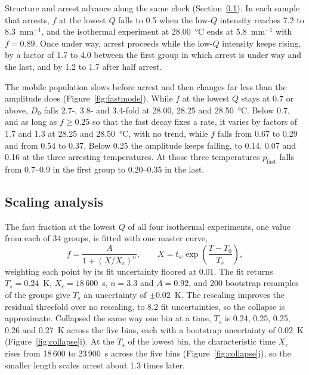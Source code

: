 \documentclass[11pt]{article}
\begin{document}
Structure and arrest advance along the same clock (Section~\ref{sec:scaling}). In each sample that arrests, $f$ at the lowest $Q$ falls to 0.5 when the low-$Q$ intensity reaches 7.2 to 8.3~mm$^{-1}$, and the isothermal experiment at \SI{28.00}{\degreeCelsius} ends at 5.8~mm$^{-1}$ with $f=0.89$. Once under way, arrest proceeds while the low-$Q$ intensity keeps rising, by a factor of 1.7 to 4.0 between the first group in which arrest is under way and the last, and by 1.2 to 1.7 after half arrest.

The mobile population slows before arrest and then changes far less than the amplitude does (Figure~\ref{fig:fastmode}). While $f$ at the lowest $Q$ stays at 0.7 or above, $D_0$ falls 2.7-, 3.8- and 3.4-fold at 28.00, 28.25 and \SI{28.50}{\degreeCelsius}. Below 0.7, and as long as $f\geq0.25$ so that the fast decay fixes a rate, it varies by factors of 1.7 and 1.3 at 28.25 and \SI{28.50}{\degreeCelsius}, with no trend, while $f$ falls from 0.67 to 0.29 and from 0.54 to 0.37. Below 0.25 the amplitude keeps falling, to 0.14, 0.07 and 0.16 at the three arresting temperatures. At those three temperatures $p_{\mathrm{fast}}$ falls from 0.7--0.9 in the first group to 0.20--0.35 in the last.

\subsection{Scaling analysis}
\label{sec:scaling}
The fast fraction at the lowest $Q$ of all four isothermal experiments, one value from each of 34 groups, is fitted with one master curve,
\begin{equation}
 f=\frac{A}{1+(X/X_c)^{n}},\qquad X=t_w\exp\!\left(\frac{T-T_0}{T_s}\right),
 \label{eq:si-master}
\end{equation}
weighting each point by its fit uncertainty floored at 0.01. The fit returns $T_s=0.24$~K, $X_c=18\,600$~s, $n=3.3$ and $A=0.92$, and 200 bootstrap resamples of the groups give $T_s$ an uncertainty of $\pm0.02$~K. The rescaling improves the residual threefold over no rescaling, to 8.2 fit uncertainties, so the collapse is approximate. Collapsed the same way one bin at a time, $T_s$ is 0.24, 0.25, 0.25, 0.26 and 0.27~K across the five bins, each with a bootstrap uncertainty of 0.02~K (Figure~\ref{fig:collapse}i). At the $T_s$ of the lowest bin, the characteristic time $X_c$ rises from 18\,600 to 23\,900~s across the five bins (Figure~\ref{fig:collapse}j), so the smaller length scales arrest about 1.3 times later.
\end{document}
